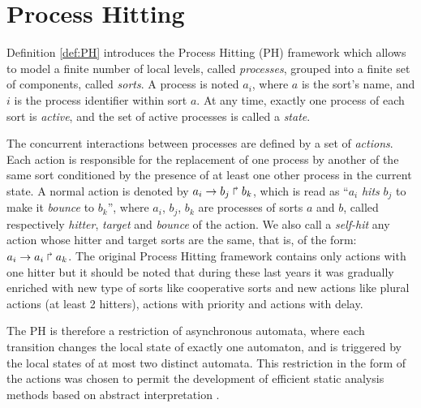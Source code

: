 
\section{Process Hitting}
\label{sec:ph}

Definition \ref{def:PH} introduces the Process Hitting (PH) framework \cite{PMR10-TCSB}
which allows to model a finite number of local levels,
called \emph{processes},
grouped into a finite set of components, called \emph{sorts}.
A process is noted $a_i$, where $a$ is the sort's name,
and $i$ is the process identifier within sort $a$.
At any time, exactly one process of each sort is \emph{active},
and the set of active processes is called a \emph{state}.

The concurrent interactions between processes are defined by a set of \emph{actions}.
Each action is responsible for the replacement of one process by another of the same sort
conditioned by the presence of at least one other process in the current state.
A normal action is denoted by $a_i\rightarrow b_j\Rsh b_k$, which is read as
“$a_i$ \emph{hits} $b_j$ to make it \emph{bounce} to $b_k$”,
where $a_i$, $b_j$, $b_k$ are processes of sorts $a$ and $b$,
called respectively \emph{hitter}, \emph{target} and
\emph{bounce} of the action. 
We also call a \emph{self-hit} any action whose hitter and target sorts are the same,
that is, of the form: $a_i\rightarrow a_i\Rsh a_k$. The original Process Hitting framework contains only actions with one hitter but it should be noted that during these last years it was gradually enriched with new type of sorts like cooperative sorts and new actions like plural actions \cite{folschette-phd-14} (at least 2 hitters), actions with priority \cite{FPMR13-CS2Bio} and actions with delay.

The PH is therefore a restriction of asynchronous automata, where each transition
changes the local state of exactly one automaton,
and is triggered by the local states of at most two distinct automata.
This restriction in the form of the actions was chosen to permit
the development of efficient static analysis methods
based on abstract interpretation \cite{PMR12-MSCS}.

